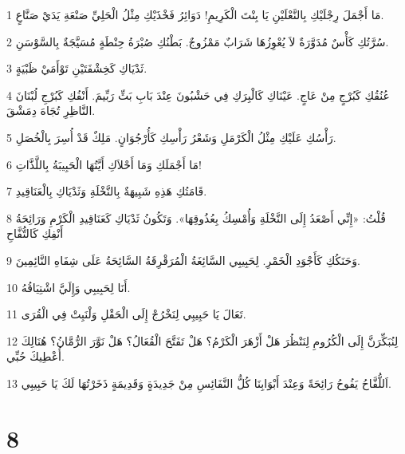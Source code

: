 \par 1 مَا أَجْمَلَ رِجْلَيْكِ بِالنَّعْلَيْنِ يَا بِنْتَ الْكَرِيمِ! دَوَائِرُ فَخْذَيْكِ مِثْلُ الْحَلِيِّ صَنْعَةِ يَدَيْ صَنَّاعٍ.
\par 2 سُرَّتُكِ كَأْسٌ مُدَوَّرَةٌ لاَ يُعْوِزُهَا شَرَابٌ مَمْزُوجٌ. بَطْنُكِ صُبْرَةُ حِنْطَةٍ مُسَيَّجَةٌ بِالسَّوْسَنِ.
\par 3 ثَدْيَاكِ كَخِشْفَتَيْنِ تَوْأَمَيْ ظَبْيَةٍ.
\par 4 عُنُقُكِ كَبُرْجٍ مِنْ عَاجٍ. عَيْنَاكِ كَالْبِرَكِ فِي حَشْبُونَ عِنْدَ بَابِ بَثِّ رَبِّيمَ. أَنْفُكِ كَبُرْجِ لُبْنَانَ النَّاظِرِ تُجَاهَ دِمَشْقَ.
\par 5 رَأْسُكِ عَلَيْكِ مِثْلُ الْكَرْمَلِ وَشَعْرُ رَأْسِكِ كَأُرْجُوَانٍ. مَلِكٌ قَدْ أُسِرَ بِالْخُصَلِ.
\par 6 مَا أَجْمَلَكِ وَمَا أَحْلاَكِ أَيَّتُهَا الْحَبِيبَةُ بِاللَّذَّاتِ!
\par 7 قَامَتُكِ هَذِهِ شَبِيهَةٌ بِالنَّخْلَةِ وَثَدْيَاكِ بِالْعَنَاقِيدِ.
\par 8 قُلْتُ: «إِنِّي أَصْعَدُ إِلَى النَّخْلَةِ وَأُمْسِكُ بِعُذُوقِهَا». وَتَكُونُ ثَدْيَاكِ كَعَنَاقِيدِ الْكَرْمِ وَرَائِحَةُ أَنْفِكِ كَالتُّفَّاحِ
\par 9 وَحَنَكُكِ كَأَجْوَدِ الْخَمْرِ. لِحَبِيبِي السَّائِغَةُ الْمُرَقْرِقَةُ السَّائِحَةُ عَلَى شِفَاهِ النَّائِمِينَ.
\par 10 أَنَا لِحَبِيبِي وَإِلَيَّ اشْتِيَاقُهُ.
\par 11 تَعَالَ يَا حَبِيبِي لِنَخْرُجْ إِلَى الْحَقْلِ وَلْنَبِتْ فِي الْقُرَى.
\par 12 لِنُبَكِّرَنَّ إِلَى الْكُرُومِ لِنَنْظُرَ هَلْ أَزْهَرَ الْكَرْمُ؟ هَلْ تَفَتَّحَ الْقُعَالُ؟ هَلْ نَوَّرَ الرُّمَّانُ؟ هُنَالِكَ أُعْطِيكَ حُبِّي.
\par 13 اَللُّفَّاحُ يَفُوحُ رَائِحَةً وَعِنْدَ أَبْوَابِنَا كُلُّ النَّفَائِسِ مِنْ جَدِيدَةٍ وَقَدِيمَةٍ ذَخَرْتُهَا لَكَ يَا حَبِيبِي.

\chapter{8}

